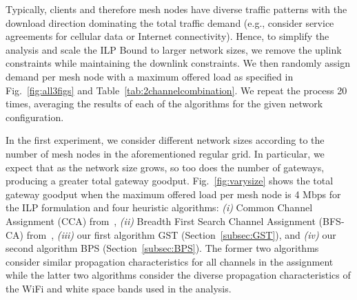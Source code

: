 
Typically, clients and therefore mesh nodes have diverse traffic patterns with
the download direction dominating the total traffic demand (e.g., consider
service agreements for cellular data or Internet connectivity). Hence, to
simplify the analysis and scale the ILP Bound to larger network sizes, we 
remove the uplink constraints while maintaining the downlink constraints.
We then randomly assign demand per mesh node with a maximum offered load
as specified in Fig.~\ref{fig:all3figs} and Table~\ref{tab:2channelcombination}.
We repeat the process 20 times, averaging the results of each of the
algorithms for the given network configuration.

In the first experiment, we consider different network sizes according to
the number of mesh nodes in the aforementioned regular grid. In particular,
we expect that as the network size grows, so too does the number of gateways,
producing a greater total gateway goodput. Fig.~\ref{fig:varysize} shows
the total gateway goodput when the maximum offered load per mesh node is
4 Mbps for the ILP formulation and four heuristic algorithms: 
{\it (i)} Common Channel Assignment (CCA) from~\cite{draves2004routing},
{\it (ii)} Breadth First Search Channel Assignment (BFS-CA) from~\cite{ramachandran2006interference},
{\it (iii)} our first algorithm GST (Section~\ref{subsec:GST}), and
{\it (iv)} our second algorithm BPS (Section~\ref{subsec:BPS}).
The former two algorithms consider similar propagation characteristics for
all channels in the assignment while the latter two algorithms consider the
diverse propagation characteristics of the WiFi and white space bands used in 
the analysis.


